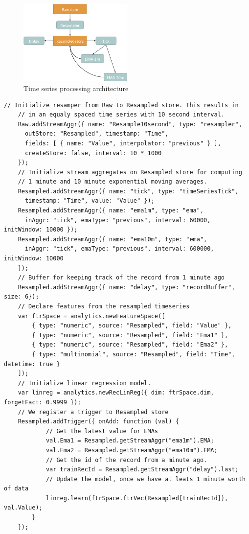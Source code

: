 \documentclass{article} %
\begin{document}
\begin{figure}[h]
\begin{center}
\includegraphics[width=0.5\textwidth]{timeSeries.png}
\end{center}
\caption{Time series processing architecture}
\end{figure}

\begin{lstlisting}[caption=Time series processing]
 	// Initialize resamper from Raw to Resampled store. This results in
 	// in an equaly spaced time series with 10 second interval.
 	Raw.addStreamAggr({ name: "Resample10second", type: "resampler",
 	  outStore: "Resampled", timestamp: "Time",
 	  fields: [ { name: "Value", interpolator: "previous" } ],
 	  createStore: false, interval: 10 * 1000
 	});
 	// Initialize stream aggregates on Resampled store for computing
 	// 1 minute and 10 minute exponential moving averages.
 	Resampled.addStreamAggr({ name: "tick", type: "timeSeriesTick",
 	  timestamp: "Time", value: "Value" });
 	Resampled.addStreamAggr({ name: "ema1m", type: "ema",
 	  inAggr: "tick", emaType: "previous", interval: 60000, initWindow: 10000 });
 	Resampled.addStreamAggr({ name: "ema10m", type: "ema",
 	  inAggr: "tick", emaType: "previous", interval: 600000, initWindow: 10000
 	});
 	// Buffer for keeping track of the record from 1 minute ago
 	Resampled.addStreamAggr({ name: "delay", type: "recordBuffer", size: 6});
 	// Declare features from the resampled timeseries
 	var ftrSpace = analytics.newFeatureSpace([
 	    { type: "numeric", source: "Resampled", field: "Value" },
 	    { type: "numeric", source: "Resampled", field: "Ema1" },
 	    { type: "numeric", source: "Resampled", field: "Ema2" },
 	    { type: "multinomial", source: "Resampled", field: "Time", datetime: true }
 	]);
 	// Initialize linear regression model.
 	var linreg = analytics.newRecLinReg({ dim: ftrSpace.dim, forgetFact: 0.9999 });
 	// We register a trigger to Resampled store
 	Resampled.addTrigger({ onAdd: function (val) {
 	        // Get the latest value for EMAs
 	        val.Ema1 = Resampled.getStreamAggr("ema1m").EMA;
 	        val.Ema2 = Resampled.getStreamAggr("ema10m").EMA;
 	        // Get the id of the record from a minute ago.
 	        var trainRecId = Resampled.getStreamAggr("delay").last;
 	        // Update the model, once we have at leats 1 minute worth of data
 	        linreg.learn(ftrSpace.ftrVec(Resampled[trainRecId]), val.Value);
 	    }
 	});

\end{lstlisting}
\end{document}
